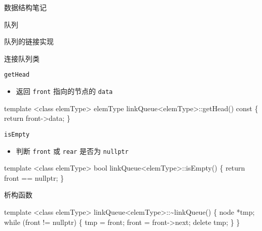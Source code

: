 \documentclass[
  ignorenonframetext,
]{beamer}
\newenvironment{Shaded}{}{}
\newcommand{\NormalTok}[1]{#1}
\providecommand{\tightlist}{%
  \setlength{\itemsep}{0pt}\setlength{\parskip}{0pt}}
\begin{document}
\begin{frame}[fragile]{数据结构笔记}
\begin{block}{队列}
\begin{block}{队列的链接实现}
\begin{block}{连接队列类}
\begin{block}{\texttt{getHead}}
\protect{}\label{gethead-1}
\begin{itemize}
\tightlist
\item
  返回 \texttt{front} 指向的节点的 \texttt{data}
\end{itemize}

\begin{Shaded}
\begin{Highlighting}[]
\NormalTok{template \textless{}class elemType\textgreater{}}
\NormalTok{elemType linkQueue\textless{}elemType\textgreater{}::getHead() const}
\NormalTok{\{}
\NormalTok{  return front{-}\textgreater{}data;}
\NormalTok{\}}
\end{Highlighting}
\end{Shaded}
\end{block}

\begin{block}{\texttt{isEmpty}}
\protect{}\label{isempty-3}
\begin{itemize}
\tightlist
\item
  判断 \texttt{front} 或 \texttt{rear} 是否为 \texttt{nullptr}
\end{itemize}

\begin{Shaded}
\begin{Highlighting}[]
\NormalTok{template \textless{}class elemType\textgreater{}}
\NormalTok{bool linkQueue\textless{}elemType\textgreater{}::isEmpty()}
\NormalTok{\{}
\NormalTok{  return front == nullptr;}
\NormalTok{\}}
\end{Highlighting}
\end{Shaded}
\end{block}

\begin{block}{析构函数}
\protect{}\label{ux6790ux6784ux51fdux6570-4}
\begin{Shaded}
\begin{Highlighting}[]
\NormalTok{template \textless{}class elemType\textgreater{}}
\NormalTok{linkQueue\textless{}elemType\textgreater{}::\textasciitilde{}linkQueue()}
\NormalTok{\{}
\NormalTok{  node *tmp;}
\NormalTok{  while (front != nullptr)}
\NormalTok{  \{}
\NormalTok{    tmp = front;}
\NormalTok{    front = front{-}\textgreater{}next;}
\NormalTok{    delete tmp;}
\NormalTok{  \}}
\NormalTok{\}}
\end{Highlighting}
\end{Shaded}
\end{block}
\end{block}
\end{block}
\end{block}


\end{frame}
\end{document}
